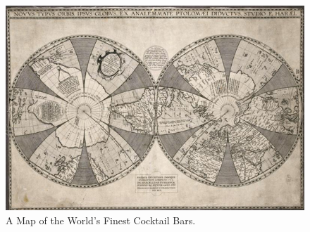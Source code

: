 \begin{figure}[tb]
\includegraphics[width=\textwidth]{Figures/cocktail_map.png}
\caption{A Map of the World's Finest Cocktail Bars.}
\label{fig:map}
\end{figure}

